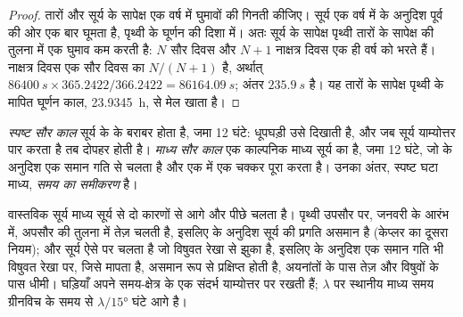 \begin{proof}
तारों और सूर्य के सापेक्ष एक वर्ष में घुमावों की गिनती कीजिए। सूर्य एक वर्ष में  के
अनुदिश पूर्व की ओर एक बार घूमता है, पृथ्वी के घूर्णन की दिशा में। अतः सूर्य के सापेक्ष पृथ्वी
तारों के सापेक्ष की तुलना में एक घुमाव कम करती है: $N$ सौर दिवस और $N + 1$ नाक्षत्र दिवस एक
ही वर्ष को भरते हैं। नाक्षत्र दिवस एक सौर दिवस का $N/(N+1)$ है, अर्थात्
$\qty{86400}{s}\times 365.2422/366.2422 = \qty{86164.09}{s}$; अंतर $\qty{235.9}{s}$ है। यह
तारों के सापेक्ष पृथ्वी के मापित घूर्णन काल, \qty{23.9345}{h}, से मेल खाता है।
\end{proof}

\begin{definition}[सौर काल]\label{def:b1:spherical-astronomy:solar-time}
\emph{स्पष्ट सौर काल} सूर्य के  के बराबर होता है, जमा 12 घंटे:
धूपघड़ी उसे दिखाती है, और जब सूर्य याम्योत्तर पार करता है तब दोपहर होती है।
\emph{माध्य सौर काल} एक काल्पनिक माध्य सूर्य का  है, जमा 12
घंटे, जो  के अनुदिश एक समान गति से चलता है और एक  में एक
चक्कर पूरा करता है। उनका अंतर, स्पष्ट घटा माध्य, \emph{समय का समीकरण}
है।
\end{definition}

वास्तविक सूर्य माध्य सूर्य से दो कारणों से आगे और पीछे चलता है। पृथ्वी उपसौर पर, जनवरी के
आरंभ में, अपसौर की तुलना में तेज़ चलती है, इसलिए  के अनुदिश सूर्य की प्रगति
असमान है (केप्लर का दूसरा नियम); और सूर्य ऐसे  पर चलता है जो विषुवत रेखा से झुका
है, इसलिए  के अनुदिश एक समान गति भी विषुवत रेखा पर, जिसे  मापता है,
असमान रूप से प्रक्षिप्त होती है, अयनांतों के पास तेज़ और विषुवों के पास धीमी। घड़ियाँ अपने
समय-क्षेत्र के एक संदर्भ याम्योत्तर पर  रखती हैं;  $\lambda$ पर स्थानीय
माध्य समय ग्रीनविच के समय से $\lambda/\ang{15}$ घंटे आगे है।

